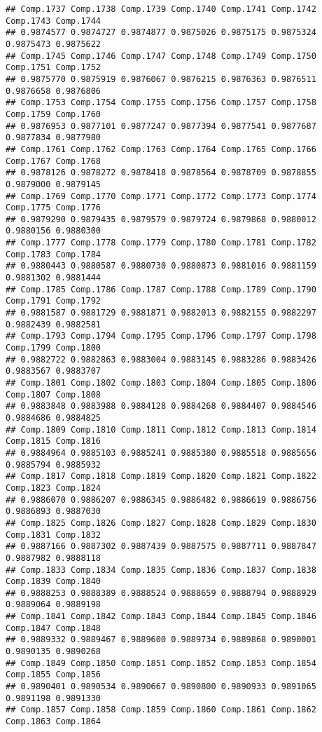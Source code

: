 \documentclass[
]{article}
\begin{document}
\begin{verbatim}
## Comp.1737 Comp.1738 Comp.1739 Comp.1740 Comp.1741 Comp.1742 Comp.1743 Comp.1744 
## 0.9874577 0.9874727 0.9874877 0.9875026 0.9875175 0.9875324 0.9875473 0.9875622 
## Comp.1745 Comp.1746 Comp.1747 Comp.1748 Comp.1749 Comp.1750 Comp.1751 Comp.1752 
## 0.9875770 0.9875919 0.9876067 0.9876215 0.9876363 0.9876511 0.9876658 0.9876806 
## Comp.1753 Comp.1754 Comp.1755 Comp.1756 Comp.1757 Comp.1758 Comp.1759 Comp.1760 
## 0.9876953 0.9877101 0.9877247 0.9877394 0.9877541 0.9877687 0.9877834 0.9877980 
## Comp.1761 Comp.1762 Comp.1763 Comp.1764 Comp.1765 Comp.1766 Comp.1767 Comp.1768 
## 0.9878126 0.9878272 0.9878418 0.9878564 0.9878709 0.9878855 0.9879000 0.9879145 
## Comp.1769 Comp.1770 Comp.1771 Comp.1772 Comp.1773 Comp.1774 Comp.1775 Comp.1776 
## 0.9879290 0.9879435 0.9879579 0.9879724 0.9879868 0.9880012 0.9880156 0.9880300 
## Comp.1777 Comp.1778 Comp.1779 Comp.1780 Comp.1781 Comp.1782 Comp.1783 Comp.1784 
## 0.9880443 0.9880587 0.9880730 0.9880873 0.9881016 0.9881159 0.9881302 0.9881444 
## Comp.1785 Comp.1786 Comp.1787 Comp.1788 Comp.1789 Comp.1790 Comp.1791 Comp.1792 
## 0.9881587 0.9881729 0.9881871 0.9882013 0.9882155 0.9882297 0.9882439 0.9882581 
## Comp.1793 Comp.1794 Comp.1795 Comp.1796 Comp.1797 Comp.1798 Comp.1799 Comp.1800 
## 0.9882722 0.9882863 0.9883004 0.9883145 0.9883286 0.9883426 0.9883567 0.9883707 
## Comp.1801 Comp.1802 Comp.1803 Comp.1804 Comp.1805 Comp.1806 Comp.1807 Comp.1808 
## 0.9883848 0.9883988 0.9884128 0.9884268 0.9884407 0.9884546 0.9884686 0.9884825 
## Comp.1809 Comp.1810 Comp.1811 Comp.1812 Comp.1813 Comp.1814 Comp.1815 Comp.1816 
## 0.9884964 0.9885103 0.9885241 0.9885380 0.9885518 0.9885656 0.9885794 0.9885932 
## Comp.1817 Comp.1818 Comp.1819 Comp.1820 Comp.1821 Comp.1822 Comp.1823 Comp.1824 
## 0.9886070 0.9886207 0.9886345 0.9886482 0.9886619 0.9886756 0.9886893 0.9887030 
## Comp.1825 Comp.1826 Comp.1827 Comp.1828 Comp.1829 Comp.1830 Comp.1831 Comp.1832 
## 0.9887166 0.9887302 0.9887439 0.9887575 0.9887711 0.9887847 0.9887982 0.9888118 
## Comp.1833 Comp.1834 Comp.1835 Comp.1836 Comp.1837 Comp.1838 Comp.1839 Comp.1840 
## 0.9888253 0.9888389 0.9888524 0.9888659 0.9888794 0.9888929 0.9889064 0.9889198 
## Comp.1841 Comp.1842 Comp.1843 Comp.1844 Comp.1845 Comp.1846 Comp.1847 Comp.1848 
## 0.9889332 0.9889467 0.9889600 0.9889734 0.9889868 0.9890001 0.9890135 0.9890268 
## Comp.1849 Comp.1850 Comp.1851 Comp.1852 Comp.1853 Comp.1854 Comp.1855 Comp.1856 
## 0.9890401 0.9890534 0.9890667 0.9890800 0.9890933 0.9891065 0.9891198 0.9891330 
## Comp.1857 Comp.1858 Comp.1859 Comp.1860 Comp.1861 Comp.1862 Comp.1863 Comp.1864 

\end{verbatim}
\end{document}
